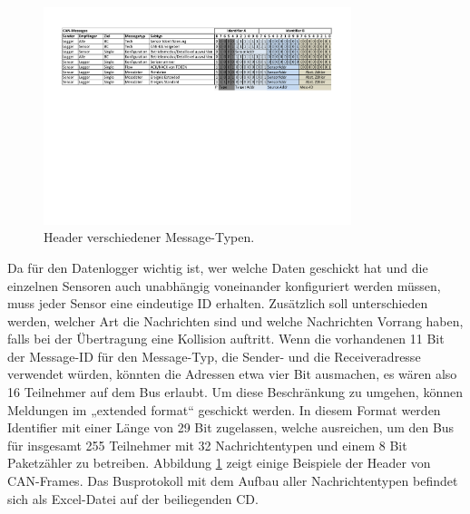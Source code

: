 \begin{figure}
	\centering
		\includegraphics[width=0.8\textwidth]{images/canmess.pdf}
	\caption{Header verschiedener Message-Typen.}
	\label{fig.canmess}
\end{figure}

Da für den Datenlogger wichtig ist, wer welche Daten geschickt hat und die einzelnen Sensoren auch unabhängig voneinander konfiguriert werden müssen, muss jeder Sensor eine eindeutige ID erhalten. Zusätzlich soll unterschieden werden, welcher Art die Nachrichten sind und welche Nachrichten Vorrang haben, falls bei der Übertragung eine Kollision auftritt. Wenn die vorhandenen 11 Bit der Message-ID für den Message-Typ, die Sender- und die Receiveradresse verwendet würden, könnten die Adressen etwa vier Bit ausmachen, es wären also 16 Teilnehmer auf dem Bus erlaubt. Um diese Beschränkung zu umgehen, können Meldungen im „extended format“ geschickt werden. In diesem Format werden Identifier mit einer Länge von 29 Bit zugelassen, welche ausreichen, um den Bus für insgesamt 255 Teilnehmer mit 32 Nachrichtentypen und einem 8 Bit Paketzähler zu  betreiben. Abbildung \ref{fig.canmess} zeigt einige Beispiele der Header von CAN-Frames. Das Busprotokoll mit dem Aufbau aller Nachrichtentypen befindet sich als Excel-Datei auf der beiliegenden CD.

